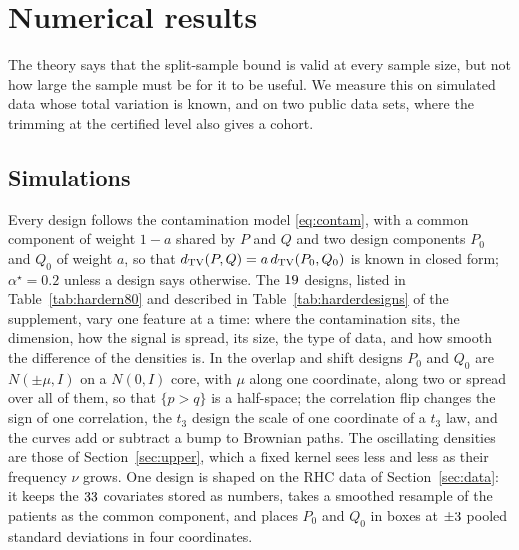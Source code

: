 \section{Numerical results}
\label{sec:numerical}

The theory says that the split-sample bound is valid at every sample size, but not how large the sample must be for
it to be useful. We measure this on simulated data whose total variation is known, and on two public data sets,
where the trimming at the certified level also gives a cohort.

\subsection{Simulations}
\label{sec:numharder}

Every design follows the contamination model \eqref{eq:contam}, with a common component of weight $1-a$ shared by $P$
and $Q$ and two design components $P_0$ and $Q_0$ of weight $a$, so that
$d_{\mathrm{TV}}(P,Q)=a\,d_{\mathrm{TV}}(P_0,Q_0)$ is known in closed form; $\alpha^\star=0.2$ unless a design says otherwise. The $19$ designs, listed in Table~\ref{tab:hardern80} and described in
Table~\ref{tab:harderdesigns} of the supplement, vary one feature at a time: where the contamination sits, the
dimension, how the signal is spread, its size, the type of data, and how smooth the difference of the densities is. In
the overlap and shift designs $P_0$ and $Q_0$ are $N(\pm\mu,I)$ on a $N(0,I)$ core, with $\mu$ along one
coordinate, along two or spread over all of them, so that $\{p>q\}$ is a half-space; the correlation flip changes the
sign of one correlation, the $t_3$ design the scale of one coordinate of a $t_3$ law, and the curves add or subtract a
bump to Brownian paths. The oscillating densities are those of Section~\ref{sec:upper}, which a fixed kernel sees less
and less as their frequency $\nu$ grows. One design is shaped on the RHC data of Section~\ref{sec:data}: it keeps the $33$
covariates stored as numbers, takes a smoothed resample of the patients as the common component, and places $P_0$ and $Q_0$
in boxes at $\pm3$ pooled standard deviations in four coordinates.

